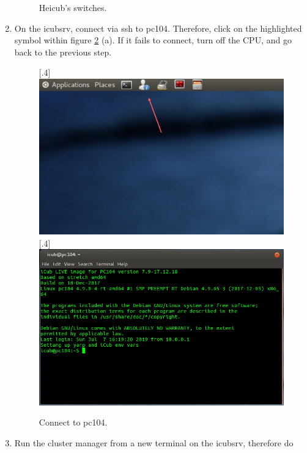 \begin{enumerate}
\begin{figure}[h!]
		\caption{Heicub's switches.}
		\label{fig::B1_cpu_motor}
	\end{figure}
	\item On the icubsrv, connect via ssh to pc104. Therefore, click on the highlighted symbol within figure \ref{fig::B1_pc104} (a). If it fails to connect, turn off the CPU, and go back to the previous step.
	\begin{figure}[h!]
		\centering
		[.4\linewidth]{\includegraphics[scale=.326]{chapters/06_appendix/img/task_bar.png}}
		[.4\linewidth]{\includegraphics[scale=.22]{chapters/06_appendix/img/terminal_pc104.png}}
		\caption{Connect to pc104.}
		\label{fig::B1_pc104}
	\end{figure}
	\item Run the cluster manager from a new terminal on the icubsrv, therefore do \newline {}

\end{enumerate}
